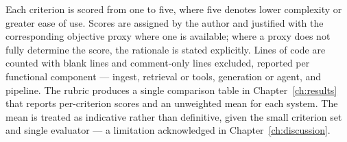 Each criterion is scored from one to five, where five denotes lower complexity or greater ease of use. Scores are assigned by the author and justified with the corresponding objective proxy where one is available; where a proxy does not fully determine the score, the rationale is stated explicitly. Lines of code are counted with blank lines and comment-only lines excluded, reported per functional component — ingest, retrieval or tools, generation or agent, and pipeline. The rubric produces a single comparison table in Chapter~\ref{ch:results} that reports per-criterion scores and an unweighted mean for each system. The mean is treated as indicative rather than definitive, given the small criterion set and single evaluator — a limitation acknowledged in Chapter~\ref{ch:discussion}.
